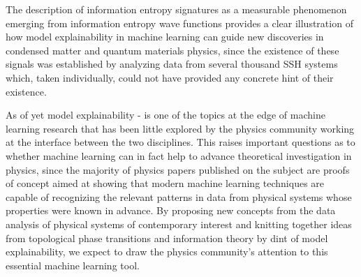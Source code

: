 \documentclass[10pt]{revtex4-1}
\newcommand{\citequote}[1]{\ref{#1}}
\begin{document}
The  description of information entropy signatures as a measurable phenomenon emerging from information entropy wave functions provides a clear illustration of how model explainability in machine learning can guide new discoveries in condensed matter and quantum materials physics, since the existence of these signals was established by analyzing data from several thousand SSH systems which, taken individually, could not have provided any concrete hint of their existence.%

As of yet model explainability \cite{gilpin2018explaining}-\cite{roscher2020explainable} is one of the topics at the edge of machine learning research that has been little explored by the physics community working at the interface between the two disciplines. This raises important questions as to whether machine learning can in fact help to advance theoretical investigation in physics, since the majority of physics papers published on the subject are proofs of concept aimed at showing that modern machine learning techniques are capable of recognizing the relevant patterns in data from physical systems whose properties were known in advance. By proposing new concepts from the data analysis of physical systems of contemporary interest and knitting together ideas from topological phase transitions and information theory by dint of model explainability, we expect to draw the physics community's attention to this essential machine learning tool. 
\end{document}
